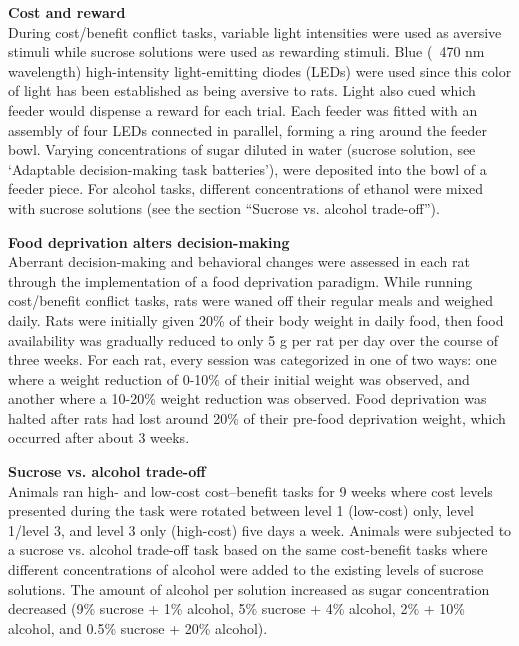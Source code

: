 \documentclass{article}
\begin{document}
\noindent\textbf{Cost and reward}\\
During cost/benefit conflict tasks, variable light intensities were used as aversive stimuli while sucrose solutions were used as rewarding stimuli. Blue (~470 nm wavelength) high-intensity light-emitting diodes (LEDs) were used since this color of light has been established as being aversive to rats\cite{friedman2017chronic, friedman2020striosomes, friedman2015corticostriatal}. Light also cued which feeder would dispense a reward for each trial. Each feeder was fitted with an assembly of four LEDs connected in parallel, forming a ring around the feeder bowl. Varying concentrations of sugar diluted in water (sucrose solution, see ‘Adaptable decision-making task batteries’), were deposited into the bowl of a feeder piece. For alcohol tasks, different concentrations of ethanol were mixed with sucrose solutions (see the section “Sucrose vs. alcohol trade-off”).

\vspace{1em}

\noindent\textbf{Food deprivation alters decision-making}\\
Aberrant decision-making and behavioral changes were assessed in each rat through the implementation of a food deprivation paradigm. While running cost/benefit conflict tasks, rats were waned off their regular meals and weighed daily. Rats were initially given 20\% of their body weight in daily food, then food availability was gradually reduced to only 5 g per rat per day over the course of three weeks. For each rat, every session was categorized in one of two ways: one where a weight reduction of 0-10\% of their initial weight was observed, and another where a 10-20\% weight reduction was observed. Food deprivation was halted after rats had lost around 20\% of their pre-food deprivation weight, which occurred after about 3 weeks.

\vspace{1em}

\noindent\textbf{Sucrose vs. alcohol trade-off}\\
Animals ran high- and low-cost cost–benefit tasks for 9 weeks where cost levels presented during the task were rotated between level 1 (low-cost) only, level 1/level 3, and level 3 only (high-cost) five days a week. Animals were subjected to a sucrose vs. alcohol trade-off task based on the same cost-benefit tasks where different concentrations of alcohol were added to the existing levels of sucrose solutions. The amount of alcohol per solution increased as sugar concentration decreased (9\% sucrose + 1\% alcohol, 5\% sucrose + 4\% alcohol, 2\% + 10\% alcohol, and 0.5\% sucrose + 20\% alcohol).
\end{document}
